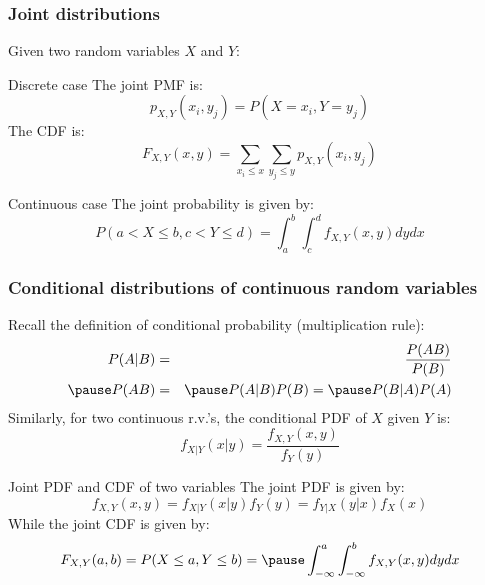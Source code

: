 \documentclass[usenames,dvipsnames,smaller%
]{beamer}
\newcommand{\?}{\stackrel{?}{=}}
\newcommand{\fr}{\frac}
\begin{document}
\begin{frame}
  \frametitle{Joint distributions}\pause
  Given two random variables $X$ and $Y$:

  \begin{block}{Discrete case}
    The joint PMF is:
    \begin{equation}
      \label{eq:62}
      p_{X,Y}(x_i,y_j) = P(X=x_i, Y = y_j)
    \end{equation} \pause
    The CDF is:
    \begin{equation}
      \label{eq:63}
      F_{X,Y}(x,y) = \sum_{x_i \le x}\sum_{y_j \le y} p_{X,Y}(x_i, y_j)
    \end{equation}
  \end{block}
  \pause

  \begin{block}{Continuous case}\pause
    The joint probability is given by:
    \begin{equation}
      P(a < X \le b, c < Y \le d) = \int_a^b \int_c^d f_{X,Y}(x,y)dy dx
    \end{equation}
  \end{block}
\end{frame}




\begin{frame}
  \frametitle{Conditional distributions of continuous random variables}
  Recall the definition of conditional probability (multiplication rule):\pause
  \begin{eqnarray}
    P(A|B) &=& \fr{P(AB)}{P(B)} \\\pause
    P(AB) &=& \pause P(A|B)P(B)  = \pause P(B|A)P(A)
  \end{eqnarray}
  \pause
  Similarly, for two continuous r.v.'s, the conditional PDF of $X$ given $Y$ is:
  \begin{equation}
    \label{eq:10}
    f_{X|Y}(x|y) = \fr{f_{X,Y}(x,y)}{f_Y(y)}
  \end{equation}
  \pause
  \begin{block}{Joint PDF and CDF of two variables}\pause
  The joint PDF is given by:
  \begin{equation}
    \label{eq:11}
    f_{X,Y}(x,y) = f_{X|Y}(x|y)f_Y(y) = f_{Y|X}(y|x)f_X(x)
  \end{equation}
  \pause
  While the joint CDF is given by:
   \begin{equation}
    \label{eq:13}
    F_{X,Y}(a,b) = P(X\le a,Y\le b) =\pause \int_{-\infty}^a \int_{-\infty}^b f_{X,Y}(x,y)dydx
  \end{equation}
\end{block}
\end{frame}
\end{document}

